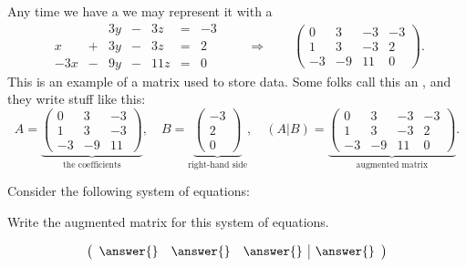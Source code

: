 \documentclass{ximera}
\begin{document}
Any time we have a  we may represent it with a
\[
\begin{array}{ccccccc}
       & & 3y &-& 3z &=& -3 \\
     x& +&3y&-&3z&=&2\\
     -3x& -&9y&-&11z&=&0
\end{array}
\qquad\Longrightarrow\qquad
\left(\begin{array}{ccc|c}
  0 &   3 & -3 & -3 \\
  1 &   3 & -3 & 2  \\
  -3& -9  & 11 & 0
\end{array}\right).
\]
This is an example of a matrix used to store data. Some folks call
this an , and they write stuff like this:
\[
A = \underbrace{\begin{pmatrix}
  0 & 3 & -3  \\
  1 &  3  & -3 \\
 -3 & -9 & 11
\end{pmatrix}}_{\text{the coefficients}},
\quad
B =
\underbrace{\begin{pmatrix}
 -3\\ 2 \\ 0 
\end{pmatrix}}_{\text{right-hand side}},
\quad
\left(A|B\right) = \underbrace{\left(\begin{array}{ccc|c}
  0 &   3 & -3 & -3 \\
  1 &   3 & -3 & 2  \\
  -3& -9  & 11 & 0
\end{array}\right)}_{\text{augmented matrix}}.
\]

\begin{question}
  Consider the following system of equations:

  Write the augmented matrix for this system of equations.
  \begin{prompt}
    \[
    \left(\begin{array}{ccc|c}
      \answer{} & \answer{} & \answer{} & \answer{}
    \end{array}\right)
    \]
  \end{prompt}
\end{question}
\end{document}
